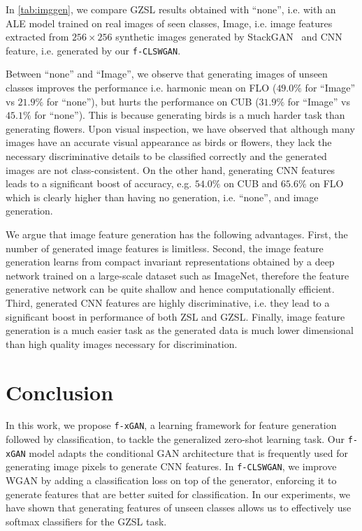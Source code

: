 \documentclass[10pt,twocolumn,letterpaper]{article}
\def\mthd{\texttt{f-xGAN}\xspace}
\begin{document}
In \autoref{tab:imggen}, we compare GZSL results obtained with ``none'', i.e. with an ALE model trained on real images of seen classes, Image, i.e. image features extracted from $256\times 256$ synthetic images generated by StackGAN~\cite{han2017stackgan} and CNN feature, i.e. generated by our \texttt{f-CLSWGAN}. 

Between ``none'' and ``Image'', we observe that generating images of unseen classes improves the performance i.e. harmonic mean on FLO ($49.0\%$ for ``Image'' vs $21.9\%$ for ``none''), but hurts the performance on CUB ($31.9\%$ for ``Image'' vs $45.1\%$ for ``none''). This is because generating birds is a much harder task than generating flowers.
Upon visual inspection, we have observed that although many images have an accurate visual appearance as birds or flowers, they lack the necessary discriminative details to be classified correctly and the generated images are not class-consistent. On the other hand, generating CNN features leads to a significant boost of accuracy, e.g. $54.0\%$ on CUB and $65.6\%$ on FLO which is clearly higher than having no generation, i.e. ``none'', and image generation. 

We argue that image feature generation has the following advantages. First, the number of generated image features is limitless. Second, the image feature generation learns from compact invariant representations obtained by a deep network trained on a large-scale dataset such as ImageNet, therefore the feature generative network can be quite shallow and hence computationally efficient.
Third, generated CNN features are highly discriminative, i.e. they lead to a significant boost in performance of both ZSL and GZSL. Finally, image feature generation is a much easier task as the generated data is much lower dimensional than high quality images necessary for discrimination.







\section{Conclusion}

In this work, we propose \mthd, a learning framework for feature generation followed by classification, to tackle the generalized zero-shot learning task.
Our \mthd model adapts the conditional GAN architecture that is frequently used for generating image pixels to generate CNN features.
In \texttt{f-CLSWGAN}, we improve WGAN by adding a classification loss on top of the generator, enforcing it to generate features that are better suited for classification. 
In our experiments, we have shown that generating features of unseen classes allows us to effectively use softmax classifiers for the GZSL task.
\end{document}
